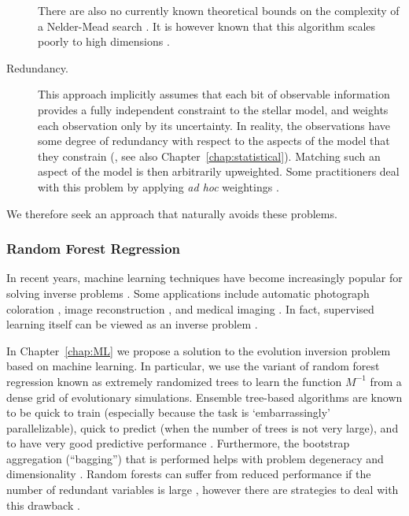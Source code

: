 \begin{description}
    There are also no currently known theoretical bounds on the complexity of a Nelder-Mead search \citep{singer1999complexity}. 
    It is however known that this algorithm scales poorly to high dimensions \citep[e.g.,][]{Chen2015}. 
    
    \item[Redundancy.] This approach implicitly assumes that each bit of observable information provides a fully independent constraint to the stellar model, and weights each observation only by its uncertainty. 
    In reality, the observations have some degree of redundancy with respect to the aspects of the model that they constrain (, see also Chapter~\ref{chap:statistical}). 
    Matching such an aspect of the model is then arbitrarily upweighted. 
    Some practitioners deal with this problem by applying \emph{ad hoc} weightings \citep[e.g.,][]{2013apjs..208....4p}. 
\end{description}
We therefore seek an approach that naturally avoids these problems. 

\subsubsection*{Random Forest Regression} 
In recent years, machine learning techniques have become increasingly popular for solving inverse problems \citep[e.g.,][]{rosasco2005learning, fai2017inner, 2017InvPr..33l4007A}. 
Some applications include automatic photograph coloration \citep{larsson2016learning}, image reconstruction \citep[e.g.,][]{2017arXiv170300555S}, and medical imaging \citep[e.g.,][]{prato2008inverse, jin2017deep}. 
In fact, supervised learning itself can be viewed as an inverse problem \citep{vito2005learning}. 

In Chapter~\ref{chap:ML} we propose a solution to the evolution inversion problem based on machine learning. 
In particular, we use the variant of random forest regression \citep{breiman2001random} known as extremely randomized trees \citep{geurts2006extremely} to learn the function $M^{-1}$ from a dense grid of evolutionary simulations. 
Ensemble tree-based algorithms are known to be quick to train (especially because the task is `embarrassingly' parallelizable), quick to predict (when the number of trees is not very large), and to have very good predictive performance \citep[e.g.,][]{Caruana:2006:ECS:1143844.1143865}. %
Furthermore, the bootstrap aggregation (``bagging'') that is performed helps with problem degeneracy and dimensionality \citep[e.g.,][]{Skurichina2002}. 
Random forests can suffer from reduced performance if the number of redundant variables is large \citep{louppe2014understanding}, however there are strategies to deal with this drawback \citep{tuv2009feature}. 

